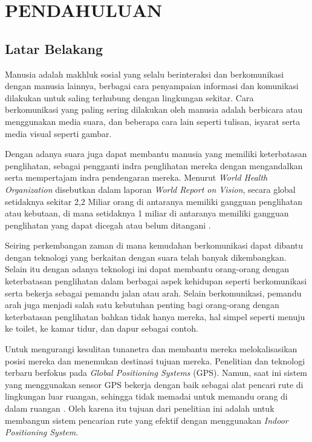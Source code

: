 \fancyhf{} 
\fancyfoot[C]{\thepage}

\chapter{PENDAHULUAN}

\section{Latar Belakang}
Manusia adalah makhluk sosial yang selalu berinteraksi dan berkomunikasi dengan manusia lainnya, berbagai cara penyampaian informasi dan komunikasi dilakukan untuk saling terhubung dengan lingkungan sekitar. Cara berkomunikasi yang paling sering dilakukan oleh manusia adalah berbicara atau menggunakan media suara, dan beberapa cara lain seperti tulisan, isyarat serta media visual seperti gambar.

Dengan adanya suara juga dapat membantu manusia yang memiliki keterbatasan penglihatan, sebagai pengganti indra penglihatan mereka dengan mengandalkan serta mempertajam indra pendengaran mereka. Menurut \textit{World Health Organization} disebutkan dalam laporan \textit{World Report on Vision}, secara global setidaknya sekitar 2,2 Miliar orang di antaranya memiliki gangguan penglihatan atau kebutaan, di mana setidaknya 1 miliar di antaranya memiliki gangguan penglihatan yang dapat dicegah atau belum ditangani \citep{who2019}. 

Seiring perkembangan zaman di mana kemudahan berkomunikasi dapat dibantu dengan teknologi yang berkaitan dengan suara telah banyak dikembangkan. Selain itu dengan adanya teknologi ini dapat membantu orang-orang dengan keterbatasan penglihatan dalam berbagai aspek kehidupan seperti berkomunikasi serta bekerja sebagai pemandu jalan atau arah. Selain berkomunikasi, pemandu arah juga menjadi salah satu kebutuhan penting bagi orang-orang dengan keterbatasan penglihatan bahkan tidak hanya mereka, hal simpel seperti menuju ke toilet, ke kamar tidur, dan dapur sebagai contoh.

\par Untuk mengurangi kesulitan tunanetra dan membantu mereka melokalisasikan posisi mereka dan menemukan destinasi tujuan mereka. Penelitian dan teknologi terbaru berfokus pada \textit{Global Positioning Systems} (GPS). Namun, saat ini sistem yang menggunakan sensor GPS bekerja dengan baik sebagai alat pencari rute di lingkungan luar ruangan, sehingga tidak memadai untuk memandu orang di dalam ruangan \citep{ko2017vision} . Oleh karena itu tujuan dari penelitian ini adalah untuk membangun sistem pencarian rute yang efektif dengan menggunakan \textit{Indoor Positioning System}.

